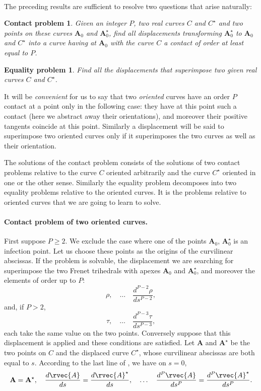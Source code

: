\paragraph{}
\label{sec:11}
The preceding results are sufficient to resolve two questions that arise naturally:
\newtheorem*{pcont}{Contact problem}
\begin{pcont}
  Given an integer $P$, two real curves $C$ and $C^{\star}$ and two points on these curves $\mathbf{A}_{0}$ and $\mathbf{A}^{\star}_{0}$, find all displacements transforming $\mathbf{A}_{0}^{\star}$ to $\mathbf{A}_{0}$ and $C^{\star}$ into a curve having at $\mathbf{A}_{0}$ with the curve $C$ a contact of order at least equal to $P$.
\end{pcont}

\newtheorem*{pequ}{Equality problem}
\begin{pequ}
  Find all the displacements that superimpose two given real curves $C$ and $C^{\star}$.
\end{pequ}

It will be \emph{convenient} for us to say that two \emph{oriented} curves have an order $P$ contact at a point only in the following case: they have at this point such a contact (here we abstract away their orientations), and moreover their positive tangents coincide at this point. Similarly a displacement will be said to superimpose two oriented curves only if it superimposes the two curves as well as their orientation.

The solutions of the contact problem consists of the solutions of two contact problems relative to the curve $C$ oriented arbitrarily and the curve $C^{\star}$ oriented in one or the other sense. Similarly the equality problem decomposes into two equality problems relative to the oriented curves. It is the problems relative to oriented curves that we are going to learn to solve.

\paragraph{Contact problem of two oriented curves.}
\label{sec:12}
First suppose $P\ge 2$. We exclude the case where one of the points $\mathbf{A}_{0}$, $\mathbf{A}_{0}^{\star}$ is an infection point. Let us choose these points as the origins of the curvilinear abscissas. If the problem is solvable, the displacement we are searching for superimpose the two Frenet trihedrals with apexes $\mathbf{A}_{0}$ and $\mathbf{A}_{0}^{\star}$, and moreover the elements of order up to $P$:
\[
\rho,\quad\dots\quad\frac{d^{P-2}\rho}{ds^{P-2}},
\]
and, if $P>2$,
\[
\tau,\quad\dots\quad\frac{d^{P-3}\tau}{ds^{P-3}},
\]
each take the same value on the two points. Conversely suppose that this displacement is applied and these conditions are satisfied. Let $\mathbf{A}$ and $\mathbf{A}^{\star}$ be the two points on $C$ and the displaced curve $C^{\star}$, whose curvilinear abscissas are both equal to $s$. According to the last line of , we have on $s=0$,
\[
\mathbf{A}=\mathbf{A}^{\star},\quad\frac{d{\rvec{A}}}{ds}=\frac{d{\rvec{A}}^{\star}}{ds},\quad\dots\quad\frac{d^{P}{\rvec{A}}}{ds^{P}}=\frac{d^{P}{\rvec{A}}^{\star}}{ds^{P}}.
\]

